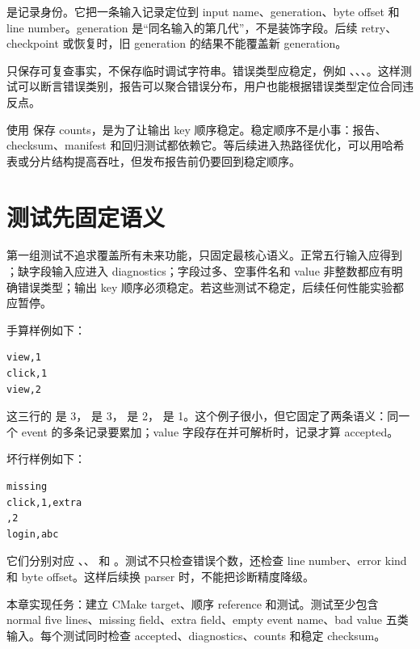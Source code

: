  是记录身份。它把一条输入记录定位到 input name、generation、byte offset 和 line number。generation 是“同名输入的第几代”，不是装饰字段。后续 retry、checkpoint 或恢复时，旧 generation 的结果不能覆盖新 generation。

 只保存可复查事实，不保存临时调试字符串。错误类型应稳定，例如 、、、。这样测试可以断言错误类别，报告可以聚合错误分布，用户也能根据错误类型定位合同违反点。

 使用  保存 counts，是为了让输出 key 顺序稳定。稳定顺序不是小事：报告、checksum、manifest 和回归测试都依赖它。等后续进入热路径优化，可以用哈希表或分片结构提高吞吐，但发布报告前仍要回到稳定顺序。

\section{测试先固定语义}

第一组测试不追求覆盖所有未来功能，只固定最核心语义。正常五行输入应得到 ；缺字段输入应进入 diagnostics；字段过多、空事件名和 value 非整数都应有明确错误类型；输出 key 顺序必须稳定。若这些测试不稳定，后续任何性能实验都应暂停。

手算样例如下：

\begin{lstlisting}
view,1
click,1
view,2
\end{lstlisting}

这三行的  是 3， 是 3， 是 2， 是 1。这个例子很小，但它固定了两条语义：同一个 event 的多条记录要累加；value 字段存在并可解析时，记录才算 accepted。

坏行样例如下：

\begin{lstlisting}
missing
click,1,extra
,2
login,abc
\end{lstlisting}

它们分别对应 、、 和 。测试不只检查错误个数，还检查 line number、error kind 和 byte offset。这样后续换 parser 时，不能把诊断精度降级。

\begin{exercisebox}
本章实现任务：建立 CMake target、顺序 reference 和测试。测试至少包含 normal five lines、missing field、extra field、empty event name、bad value 五类输入。每个测试同时检查 accepted、diagnostics、counts 和稳定 checksum。
\end{exercisebox}

